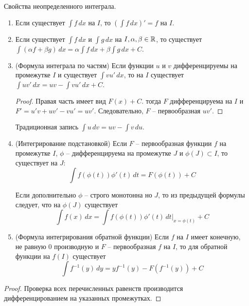     \begin{theorem}{Свойства неопределенного интеграла.}
        \begin{enumerate}
            \item Если существует \(\int f \,dx \) на $I$, то \((\int f \,dx)' = f\) на $I$.
            \item Если существует \(\int f \,dx \) и \(\int g \,dx \) на $I, \alpha, \beta \in \mathbb{R}$, то
                существует \(\int (\alpha f + \beta g) \,dx = \alpha \int f \,dx + \beta \int g \,dx + C\).
            \item (Формула интеграла по частям) Если функции $u$ и $v$ дифференцируемы на промежутке $I$
                и существует \(\int vu' \,dx\), то на $I$ существует \(\int uv' \,dx = uv - \int vu' \,dx + C\).
                \begin{proof}
                    Правая часть имеет вид $F(x) + C$. тогда $F$ дифференцируема на $I$ и $F' = u'v + uv' - vu' = uv'$.
                    Следовательно, $F$ -- первообразная $uv'$.
                \end{proof}
                
                \begin{note}
                    Традиционная запись \(\int u \,dv = uv - \int v \,du\).
                \end{note}
            \item (Интегрирование подстановкой) Если $F$ -- первообразная функции $f$ на промежутке $I$,
                $\phi$ -- дифференцируема на промежутке $J$ и $\phi(J) \subset I$, то существует на $J$:
                \[\int f(\phi(t))\phi'(t) \,dt = F(\phi(t)) + C\]
                \begin{note}
                    Если дополнительно $\phi$ -- строго монотонна но $J$, то из предыдущей формулы следует,
                    что на $\phi(J)$ существует 
                    \[\int f(x) \,dx = \int f(\phi(t)) \phi'(t) \,dt|_{x = \phi(t)} + C\]
                \end{note}
            \item (Формула интегрирования обратной функции) Если $f$ на $I$ имеет конечную, не равную 0 производную и $F$ -- первообразная $f$ на $I$, то для обратной функции на $f(I)$ существует
                \[\int f^{-1}(y) \,dy = yf^{-1}(y) - F(f^{-1}(y)) + C\]
        \end{enumerate}
    \end{theorem}
    
    \begin{proof}
        Проверка всех перечисленных равенств производится дифференцированием на указанных промежутках.
    \end{proof}
    
